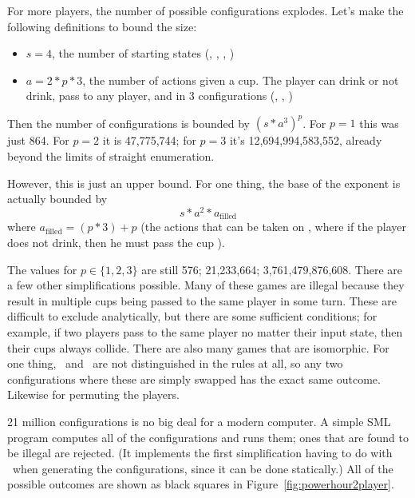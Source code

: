 \documentclass[twocolumn]{article}
\newcommand\comment[1]{}
\begin{document}
For more players, the number of possible configurations explodes.
Let's make the following definitions to bound the size:
\begin{itemize}
\item $s = 4$, the number of starting states (\fullcup, \emptycup,
  \overcup, \nocup)
\item $a = 2 * p * 3$, the number of actions given a cup. The player
  can drink or not drink, pass to any player, and in 3 configurations
  (\fullcup, \emptycup, \overcup)
\end{itemize}
Then the number of configurations is bounded by $(s * a^3)^p$. For
$p=1$ this was just 864. For $p=2$ it is 47,775,744; for $p=3$ it's
12,694,994,583,552, already beyond the limits of straight enumeration.

\comment{
fun ct (p : IntInf.int) =
  let val s = 4
      fun pow n 0 = 1
        | pow n m = n * pow n (m - 1)
      val a = 2 * p * 3
   in
      pow (s * pow a 3) p
  end
}

However, this is just an upper bound. For one thing, the base of the
exponent is actually bounded by
$$
  s * a^2 * a_{\textrm{filled}}
$$
where
$a_{\textrm{filled}} = (p * 3) + p$ (the actions that can be taken on
\fullcup, where if the player does not drink, then he must pass the
cup \fullcup).

\comment{
fun ctb (p : IntInf.int) =
  let val s = 4
      fun pow n 0 = 1
        | pow n m = n * pow n (m - 1)
      val af = p * 3 + p
      val a = 2 * p * 3
   in
      pow (s * pow a 2 * af) p
  end
}

The values for $p \in \{1,2,3\}$ are still 576; 21,233,664;
3,761,479,876,608. There are a few other simplifications possible.
Many of these games are illegal because they result in multiple cups
being passed to the same player in some turn. These are difficult to
exclude analytically, but there are some sufficient conditions; for
example, if two players pass to the same player no matter their input
state, then their cups always collide. There are also many games
that are isomorphic. For one thing, \emptycup\ and \overcup\ are not
distinguished in the rules at all, so any two configurations where
these are simply swapped has the exact same outcome. Likewise for
permuting the players.

21 million configurations is no big deal for a modern computer. A
simple SML program computes all of the configurations and runs them;
ones that are found to be illegal are rejected. (It implements the
first simplification having to do with \fullcup\ when generating the
configurations, since it can be done statically.) All of the possible
outcomes are shown as black squares in Figure~\ref{fig:powerhour2player}.
\end{document}

